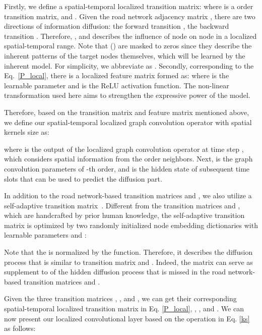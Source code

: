 \documentclass[sigconf, nonacm]{acmart}
\begin{document}
{\color{black}Firstly, we define} a spatial-temporal localized transition matrix:
{
}where  is a  order transition matrix, and .
{\color{black}
Given the road network adjacency matrix ,} there are two directions of information diffusion: the forward transition , the backward transition .
Therefore, , and  describes the influence of node  on node  in a localized spatial-temporal range.
Note that  () {\color{black} are masked to} zeros since they describe the inherent patterns of the target nodes themselves, which will be learned by the {\color{black}inherent} model.
For simplicity, we abbreviate  as {\color{black}.
Secondly, c}orresponding to the Eq.~\ref{P_local}, there is a localized feature matrix {\color{black}  formed as}:
{}where  is the learnable parameter and  is the ReLU activation function. The non-linear transformation used here aims to strengthen the expressive power of the model.

{\color{black}Therefore,} based on the {\color{black} transition matrix  and feature matrix } mentioned above, we define our spatial-temporal localized graph convolution operator with spatial kernels size  as:

where  is the output of the localized graph convolution operator at time step , which considers spatial information from the  order neighbors.
Next,  is the graph convolution parameters of -th order, and  is the hidden state of subsequent time slots that can be used to predict the {\color{black}diffusion part}.

In addition to the {\color{black}road network-based transition matrices  and }, we also utilize a self-adaptive {\color{black}transition} matrix~\cite{GWNet}.
{\color{black}
Different from the transition matrices  and , which are handcrafted by prior human knowledge, the self-adaptive transition matrix is optimized by two randomly initialized node embedding dictionaries with learnable parameters  and :
}

{\color{black}
Note that the  is normalized by the  function. 
Therefore, it describes the diffusion process that is similar to transition matrix  and .
Indeed, the matrix  can serve as supplement to of the hidden diffusion process that is missed in the road network-based transition matrices  and .
}

{\color{black}
Given the three transition matrices , , and , we can get their corresponding spatial-temporal localized transition matrix in Eq. \ref{P_local}, , , and .
}
We can now present our localized {\color{black}convolutional} layer based on the operation in Eq. \ref{ks} as follows:
\end{document}
